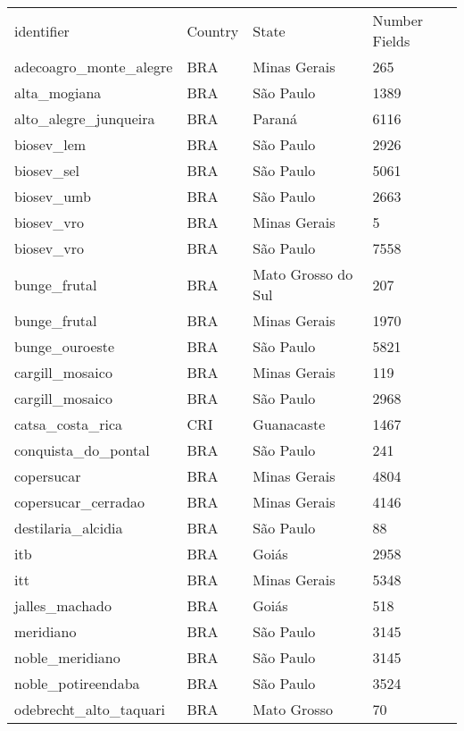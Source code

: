 \documentclass[]{article}
\begin{document}
\begin{longtable}[c]{@{}llll@{}}
\toprule\addlinespace
identifier & Country & State & Number Fields 
\\\addlinespace
\midrule\endhead
\toprule\addlinespace
adecoagro\_monte\_alegre & BRA & Minas Gerais & 265
\\\addlinespace
alta\_mogiana & BRA & São Paulo & 1389
\\\addlinespace
alto\_alegre\_junqueira & BRA & Paraná & 6116
\\\addlinespace
biosev\_lem & BRA & São Paulo & 2926
\\\addlinespace
biosev\_sel & BRA & São Paulo & 5061
\\\addlinespace
biosev\_umb & BRA & São Paulo & 2663
\\\addlinespace
biosev\_vro & BRA & Minas Gerais & 5
\\\addlinespace
biosev\_vro & BRA & São Paulo & 7558
\\\addlinespace
bunge\_frutal & BRA & Mato Grosso do Sul & 207
\\\addlinespace
bunge\_frutal & BRA & Minas Gerais & 1970
\\\addlinespace
bunge\_ouroeste & BRA & São Paulo & 5821
\\\addlinespace
cargill\_mosaico & BRA & Minas Gerais & 119
\\\addlinespace
cargill\_mosaico & BRA & São Paulo & 2968
\\\addlinespace
catsa\_costa\_rica & CRI & Guanacaste & 1467
\\\addlinespace
conquista\_do\_pontal & BRA & São Paulo & 241
\\\addlinespace
copersucar & BRA & Minas Gerais & 4804
\\\addlinespace
copersucar\_cerradao & BRA & Minas Gerais & 4146
\\\addlinespace
destilaria\_alcidia & BRA & São Paulo & 88
\\\addlinespace
itb & BRA & Goiás & 2958
\\\addlinespace
itt & BRA & Minas Gerais & 5348
\\\addlinespace
jalles\_machado & BRA & Goiás & 518
\\\addlinespace
meridiano & BRA & São Paulo & 3145
\\\addlinespace
noble\_meridiano & BRA & São Paulo & 3145
\\\addlinespace
noble\_potireendaba & BRA & São Paulo & 3524
\\\addlinespace
odebrecht\_alto\_taquari & BRA & Mato Grosso & 70

\end{longtable}
\end{document}

